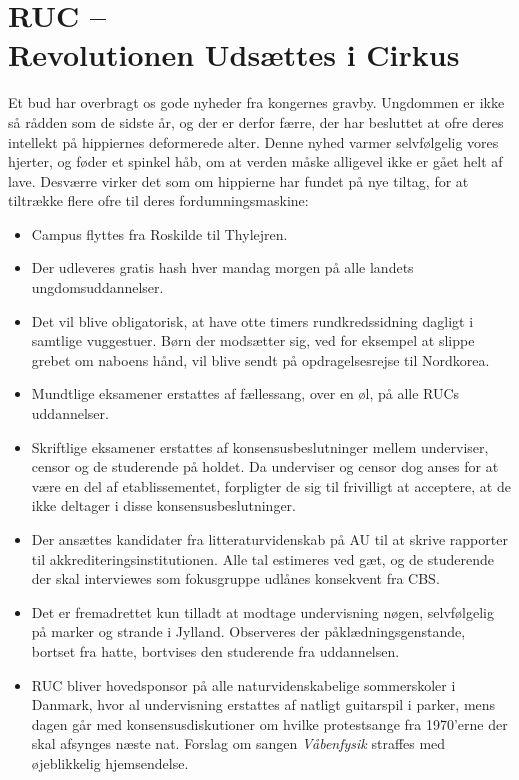 

\begin{minipage}[b]{0.95\linewidth}
\begin{minipage}[t]{0.47\textwidth}
\vspace{3mm}
\section*{RUC -- \\ Revolutionen Udsættes i Cirkus}
Et bud har overbragt os gode nyheder fra kongernes gravby. Ungdommen er ikke så rådden som de sidste år, og der er derfor færre, der har besluttet at ofre deres intellekt på hippiernes deformerede alter. Denne nyhed varmer selvfølgelig vores hjerter, og føder et spinkel håb, om at verden måske alligevel ikke er gået helt af lave. Desværre virker det som om hippierne har fundet på nye tiltag, for at tiltrække flere ofre til deres fordumningsmaskine:
\begin{itemize}
\item Campus flyttes fra Roskilde til Thylejren.
\item Der udleveres gratis hash hver mandag morgen på alle landets ungdomsuddannelser.
\item Det vil blive obligatorisk, at have otte timers rundkredssidning dagligt i samtlige vuggestuer. Børn der modsætter sig, ved for eksempel at slippe grebet om naboens hånd, vil blive sendt på opdragelsesrejse til Nordkorea.
\item Mundtlige eksamener erstattes af fællessang, over en øl, på alle RUCs uddannelser.
\item Skriftlige eksamener erstattes af konsensusbeslutninger mellem underviser, censor og de studerende på holdet. Da underviser og censor dog anses for at være en del af etablissementet, forpligter de sig til frivilligt at acceptere, at de ikke deltager i disse konsensusbeslutninger.
\item Der ansættes kandidater fra litteraturvidenskab på AU til at skrive rapporter til akkrediteringsinstitutionen. Alle tal estimeres ved gæt, og de studerende der skal interviewes som fokusgruppe udlånes konsekvent fra CBS.
\item Det er fremadrettet kun tilladt at modtage undervisning nøgen, selvfølgelig på marker og strande i Jylland. Observeres der påklædningsgenstande, bortset fra hatte, bortvises den studerende fra uddannelsen.
\item RUC bliver hovedsponsor på alle naturvidenskabelige sommerskoler i Danmark, hvor al undervisning erstattes af natligt guitarspil i parker, mens dagen går med konsensusdiskutioner om hvilke protestsange fra 1970'erne der skal afsynges næste nat. Forslag om sangen \emph{Våbenfysik} straffes med øjeblikkelig hjemsendelse.

\end{itemize}
\end{minipage}
\end{minipage}
